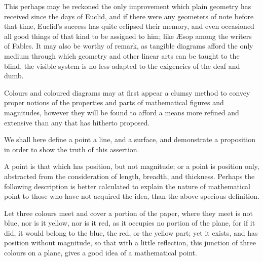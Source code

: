 \documentclass[booklanguage=english]{byrnebook}
\begin{document}
\baselineskip

This perhaps may be reckoned the only improvement which plain geometry has received since the days of Euclid, and if there were any geometers of note before that time, Euclid's success has quite eclipsed their memory, and even occasioned all good things of that kind to be assigned to him; like \AE sop among the writers of Fables. It may also be worthy of remark, as tangible diagrams afford the only medium through which geometry and other linear arts can be taught to the blind, the visible system is no less adapted to the exigencies of the deaf and dumb.


Colours and coloured diagrams may at first appear a clumsy method to convey proper notions of the properties and parts of mathematical figures and magnitudes, however they will be found to afford a means more refined and extensive than any that has hitherto proposed.

We shall here define a point a line, and a surface, and demonstrate a proposition in order to show the truth of this assertion.

A point is that which has position, but not magnitude; or a point is position only, abstracted from the consideration of length, breadth, and thickness. Perhaps the following description is better calculated to explain the nature of mathematical point to those who have not acquired the idea, than the above specious definition.

Let three colours \drawCurrentPictureInMargin meet and cover a portion of the paper, where they meet is not blue, nor is it yellow, nor is it red, as it occupies no portion of the plane, for if it did, it would belong to the blue, the red, or the yellow part; yet it exists, and has position without magnitude, so that with a little reflection, this junction of three colours on a plane, gives a good idea of a mathematical point.
\end{document}
